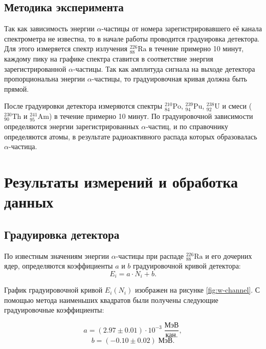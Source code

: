 \documentclass[a4paper, 12pt]{article}
\newcommand{\elem}[3]{{}^{#2}_{#3}\text{#1}}
\newcommand{\Ra}{\elem{Ra}{226}{88}}
\newcommand{\Pu}{\elem{Pu}{239}{94}}
\newcommand{\Po}{\elem{Po}{210}{84}}
\newcommand{\Ua}{\elem{U}{238}{92}}
\newcommand{\Th}{\elem{Th}{230}{90}}
\newcommand{\Am}{\elem{Am}{241}{95}}
\begin{document}
    \subsection{Методика эксперимента}
	
    Так как зависимость энергии $\alpha$-частицы от номера зарегистрировавшего её канала спектрометра не известна, то в начале работы проводится градуировка детектора. Для этого измеряется спектр излучения $\Ra$ в течение примерно 10 минут, каждому пику на графике спектра ставится в соответствие энергия зарегистрированной $\alpha$-частицы. Так как амплитуда сигнала на выходе детектора пропорциональна энергии $\alpha$-частицы, то градуировочная кривая должна быть прямой.
	
    После градуировки детектора измеряются спектры $\Po$, $\Pu$, $\Ua$ и смеси ($\Th$ и $\Am$) в течение примерно 10 минут. По градуировочной зависимости определяются энергии зарегистрированных $\alpha$-частиц, и по справочнику определяются атомы, в результате радиоактивного распада которых образовалась $\alpha$-частица.

    \newpage
	
    \section{Результаты измерений и обработка данных}

    \subsection{Градуировка детектора}
    По известным значениям энергии $\alpha$-частицы при распаде $\Ra$ и его дочерних ядер, определяются коэффициенты $a$ и $b$ градуировочной кривой детектора:
    $$
    E_i = a\cdot N_i + b.
    $$
	
    График градуировочной кривой $E_i(N_i)$ изображен на рисунке \ref{fig:w-channel}. С помощью метода наименьших квадратов были получены следующие градуировочные коэффициенты:
	
    $$ a = (2.97 \pm 0.01) \cdot 10^{-3} \; \frac{ \text{МэВ} }{ \text{кан.} },$$
    $$ b = (-0.10 \pm 0.02) \; \text{МэВ}.$$
	
\end{document}
